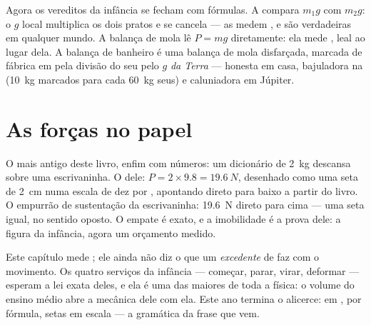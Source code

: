 \begin{remark}\label{rem:g9:weight-vs-mass:scales}
Agora os vereditos da infância se fecham com fórmulas. A  compara $m_1 g$ com $m_2 g$: o $g$ local multiplica os dois
pratos e se cancela --- as  medem \emph{}, e
são verdadeiras em qualquer mundo. A balança de mola lê $P = m g$
diretamente: ela mede \emph{}, leal ao lugar dela. A balança de
banheiro é uma balança de mola disfarçada, marcada de fábrica em
 pela divisão do seu  pelo $g$ \emph{da Terra} ---
honesta em casa, bajuladora na  (\qty{10}{kg} marcados para cada
\qty{60}{kg} seus) e caluniadora em Júpiter.
\end{remark}

\section{As forças no papel}

\begin{example}\label{ex:g9:weight-vs-mass:book}
O  mais antigo deste livro, enfim com números: um
dicionário de \qty{2}{kg} descansa sobre uma escrivaninha. O 
dele: $P = 2 \times 9.8 = \qty{19.6}{N}$, desenhado como uma seta de
\qty{2}{cm} numa escala de dez  por , apontando
direto para baixo a partir do livro. O empurrão de sustentação da
escrivaninha: \qty{19.6}{N} direto para cima --- uma seta igual, no
sentido oposto. O empate é exato, e a imobilidade é a prova dele: a
figura da infância, agora um orçamento medido.
\end{example}

\begin{remark}\label{rem:g9:weight-vs-mass:dynamics}
Este capítulo mede ; ele ainda não diz o que um \emph{excedente}
de  faz com o movimento. Os quatro serviços da infância ---
começar, parar, virar, deformar --- esperam a lei exata deles, e ela é
uma das maiores de toda a física: o volume do ensino médio abre a
mecânica dele com ela. Este ano termina o alicerce:  em
,  por fórmula, setas em escala --- a gramática da frase
que vem.
\end{remark}

